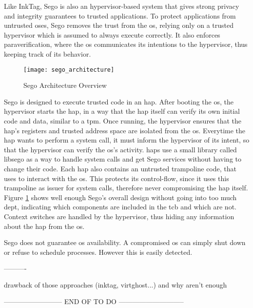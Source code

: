 
Like InkTag, Sego \cite{segoPaper} is also an hypervisor-based system that gives strong privacy and integrity guarantees to trusted applications. To protect applications from untrusted \gls{os}es, Sego removes the trust from the \gls{os}, relying only on a trusted hypervisor which is assumed to always execute correctly. It also enforces paraverification, where the \gls{os} communicates its intentions to the hypervisor, thus keeping track of its behavior.

\begin{figure}[htbp]
	\centering
	{\texttt{[image: sego\_architecture]}}
	\caption{Sego Architecture Overview}
	\label{fig:segoArchitecture}
\end{figure}

Sego is designed to execute trusted code in an \gls{hap}.
After booting the \gls{os}, the hypervisor starts the \gls{hap}, in a way that the \gls{hap} itself can verify its own initial code and data, similar to a \gls{tpm}.
Once running, the hypervisor ensures that the \gls{hap}’s registers and trusted address space are isolated from the \gls{os}. Everytime the \gls{hap} wants to perform a system call, it must inform
the hypervisor of its intent, so that the hypervisor can verify the \gls{os}'s activity. \gls{hap}s use a
small library called libsego as a way to handle system calls and get Sego services without having to change their code. Each \gls{hap} also contains an untrusted trampoline code, that
uses to interact with the \gls{os}. This protects its control-flow, since it uses this trampoline as issuer for system calls, therefore never compromising the \gls{hap} itself. Figure \ref{fig:segoArchitecture} shows well enough Sego’s overall design without going into too much dept, indicating which components are included in the \gls{tcb} and which are not.
Context switches are handled by the hypervisor, thus hiding any information about the \gls{hap} from the \gls{os}.

Sego does not guarantee \gls{os} availability. A compromised \gls{os} can simply shut down or refuse to schedule processes. However this is easily detected.



----------

			drawback of those approaches (inktag, virtghost...)
			and why aren't enough
			
-------------------------- END OF TO DO -----------------------------

